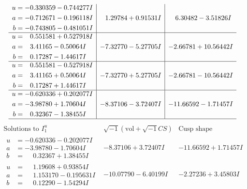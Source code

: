 \documentclass[1p]{elsarticle_modified}
\theoremstyle{definition}
\newcommand{\I}{\sqrt{-1}}
\begin{document}
$$\begin{array}{c|c|c}
\begin{aligned}
u &= -0.330359 - 0.744277 I \\
a &= -0.712671 - 0.196118 I \\
b &= -0.743805 - 0.481051 I\end{aligned}
 & \phantom{-}1.29784 + 0.91531 I & \phantom{-}6.30482 - 3.51826 I \\ \hline\begin{aligned}
u &= \phantom{-}0.551581 + 0.527918 I \\
a &= \phantom{-}3.41165 - 0.50064 I \\
b &= \phantom{-}0.17287 - 1.44617 I\end{aligned}
 & -7.32770 - 5.27705 I & -2.66781 + 10.56442 I \\ \hline\begin{aligned}
u &= \phantom{-}0.551581 - 0.527918 I \\
a &= \phantom{-}3.41165 + 0.50064 I \\
b &= \phantom{-}0.17287 + 1.44617 I\end{aligned}
 & -7.32770 + 5.27705 I & -2.66781 - 10.56442 I \\ \hline\begin{aligned}
u &= -0.620336 + 0.202077 I \\
a &= -3.98780 + 1.70604 I \\
b &= \phantom{-}0.32367 - 1.38455 I\end{aligned}
 & -8.37106 - 3.72407 I & -11.66592 - 1.71457 I\\
 \hline 
 \end{array}$$\newpage$$\begin{array}{c|c|c}  
\text{Solutions to }I^u_{1}& \I (\text{vol} + \sqrt{-1}CS) & \text{Cusp shape}\\
 \hline 
\begin{aligned}
u &= -0.620336 - 0.202077 I \\
a &= -3.98780 - 1.70604 I \\
b &= \phantom{-}0.32367 + 1.38455 I\end{aligned}
 & -8.37106 + 3.72407 I & -11.66592 + 1.71457 I \\ \hline\begin{aligned}
u &= \phantom{-}1.19608 + 0.93854 I \\
a &= \phantom{-}1.153170 - 0.195631 I \\
b &= \phantom{-}0.12290 - 1.54294 I\end{aligned}
 & -10.07790 - 6.40199 I & -2.27236 + 3.45803 I \\ \hline\begin{aligned}

\end{aligned}
\end{array}$$
\end{document}
